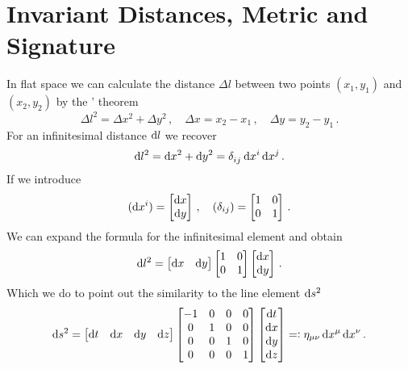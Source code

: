 \section{Invariant Distances, Metric and Signature}
In flat space we can calculate the distance $\Delta l$ between two points
$(x_1,y_1)$ and $(x_2,y_2)$ by the ' theorem
\begin{equation}
    \Delta l^2=\Delta x^2+\Delta y^2\, ,
    \quad \Delta x=x_2-x_1\,,\quad \Delta
    y=y_2-y_1\, .
\end{equation}
For an infinitesimal distance $\dif l$ we recover
\begin{equation}
    \dif l^2=\dif x^2+\dif y^2=\tensor{\delta}{_i_j}\dif x^i\dif x^j\, .
\end{equation}
If we introduce
\begin{equation}
    (\dif x^i)=\begin{bmatrix}
\dif x\\
\dif y
\end{bmatrix}\,,\quad (\delta_{ij})
=\begin{bmatrix}
1 & 0\\
0 & 1
\end{bmatrix}\, .
\end{equation}
We can expand the formula for the infinitesimal element and obtain
\begin{equation}
    \dif l^2=
    \begin{bmatrix}
        \dif x &
        \dif y
    \end{bmatrix}
    \begin{bmatrix}
        1 & 0\\
        0 & 1
    \end{bmatrix}
    \begin{bmatrix}
        \dif x\\
        \dif y
    \end{bmatrix}\, .
\end{equation}
Which we do to point out the similarity to the line element $\dif s^2$
\begin{equation}
    \dif s^2=
    \begin{bmatrix}
        \dif t &
        \dif x &
        \dif y &
        \dif z
    \end{bmatrix}
    \begin{bmatrix}
        -1 & 0 & 0 & 0\\
        0  & 1 & 0 & 0\\
        0  & 0 & 1 & 0\\
        0  & 0 & 0 & 1\\
    \end{bmatrix}
    \begin{bmatrix}
        \dif t\\
        \dif x\\
        \dif y\\
        \dif z\\
    \end{bmatrix}=:\eta_{\mu\nu}\dif x^\mu\dif x^\nu\, .
\end{equation}
